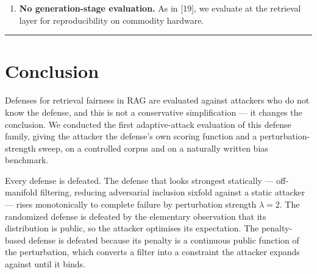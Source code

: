 \documentclass[review,3p,times]{elsarticle}
\begin{document}
\begin{enumerate}
  \textbf{Defense and backbone coverage.} Three defenses from two mechanism families. Six vector back-ends are covered (our feature-hashing retriever, GTE-base, E5-base-v2, Contriever, and SPLADE at both distil and efficient-large size), but all are base-size checkpoints and all are English; covering the embedder-control {[}7{]} and constrained-optimisation {[}5{]} families would strengthen the generality of Finding 1; we argue the structural argument of §4 applies to both, since embedder control is also a fixed public map and constrained optimisation has a public objective. The back-end sweep does establish one negative result that bears on the literature: the \emph{abruptness} of the adaptive collapse is not predictable from the encoder's family, since GTE-base and E5-base-v2 fail in one step while Contriever and the learned-sparse SPLADE do not --- and the companion paper reports that static text-attack effectiveness varies nine-fold across the same encoder set (Contriever 0.5625 versus GTE-base and E5-base-v2 at 0.0625). Adaptive robustness should be expected to vary at least as much, which is a reason to expect that single-backbone robustness claims in this literature are not portable. Larger checkpoints remain to be swept.
\item
  \textbf{No generation-stage evaluation.} As in {[}19{]}, we evaluate at the retrieval layer for reproducibility on commodity hardware.
\end{enumerate}

\begin{center}\rule{0.5\linewidth}{0.5pt}\end{center}

\section{Conclusion}\label{conclusion}

Defenses for retrieval fairness in RAG are evaluated against attackers who do not know the defense, and this is not a conservative simplification --- it changes the conclusion. We conducted the first adaptive-attack evaluation of this defense family, giving the attacker the defense's own scoring function and a perturbation-strength sweep, on a controlled corpus and on a naturally written bias benchmark.

Every defense is defeated. The defense that looks strongest statically --- off-manifold filtering, reducing adversarial inclusion sixfold against a static attacker --- rises monotonically to complete failure by perturbation strength \(\lambda = 2\). The randomized defense is defeated by the elementary observation that its distribution is public, so the attacker optimises its expectation. The penalty-based defense is defeated because its penalty is a continuous public function of the perturbation, which converts a filter into a constraint the attacker expands against until it binds.
\end{document}
